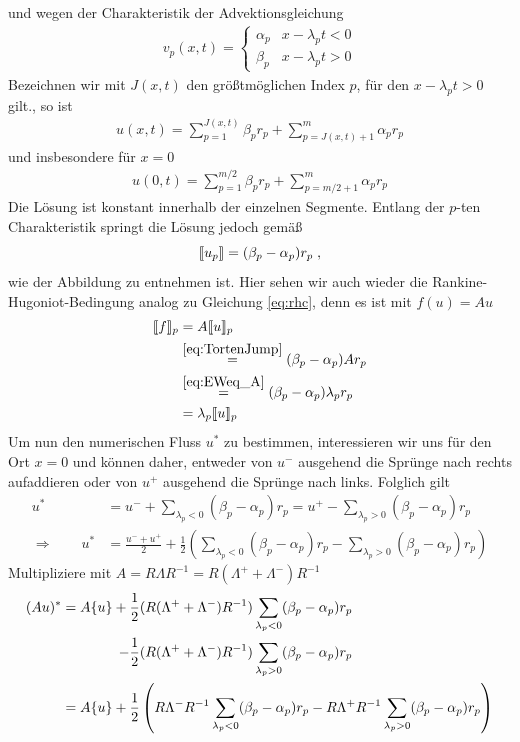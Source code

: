 und wegen der Charakteristik der Advektionsgleichung
\begin{align}
  v_p(x,t) = \begin{cases} \alpha_p & x - \lambda_p t < 0 \\
                           \beta_p & x - \lambda_p t > 0
            \end{cases}
\end{align}
Bezeichnen wir mit $J(x,t)$ den größtmöglichen Index $p$, für den $x-\lambda_p t > 0$ gilt., so ist
\begin{align}
  u(x,t) = \sum_{p=1}^{J(x,t)} \beta_p r_p + \sum_{p={J(x,t)}+1}^m \alpha_p r_p
\end{align}
und insbesondere für $x=0$
\begin{align}
  u(0,t) = \sum_{p=1}^{m/2} \beta_p r_p + \sum_{p=m/2+1}^m \alpha_p r_p
\end{align}
Die Lösung ist konstant innerhalb der einzelnen Segmente. Entlang der $p$-ten Charakteristik springt die Lösung jedoch gemäß
\begin{equation}
  \llbracket u_p \rrbracket = (\beta_p - \alpha_p) r_p \; ,
  \label{eq:TortenJump}
\end{equation}
wie der Abbildung zu entnehmen ist. Hier sehen wir auch wieder die Rankine-Hugoniot-Bedingung analog zu Gleichung \eqref{eq:rhc}, denn es ist mit $f(u) = A u$
\begin{align}
  \llbracket f \rrbracket_p &= A\llbracket u \rrbracket_p\\
  &\stackrel{\eqref{eq:TortenJump}}{=} (\beta_p - \alpha_p) A r_p \\
  &\stackrel{\eqref{eq:EWeq_A}}{=}  (\beta_p - \alpha_p) \lambda_p r_p \\
  &= \lambda_p \llbracket u \rrbracket_p
\end{align}
Um nun den numerischen Fluss $u^*$ zu bestimmen, interessieren wir uns für den Ort $x=0$ und können daher, entweder von $u^-$ ausgehend die Sprünge nach rechts aufaddieren oder von $u^+$ ausgehend die Sprünge nach links. Folglich gilt
\begin{align}
  \label{eq:rhc_1}
  u^* &= u^- + \sum_{\lambda_p < 0} (\beta_p - \alpha_p)r_p = u^+ - \sum_{\lambda_p > 0} (\beta_p - \alpha_p)r_p \\
  \Rightarrow \qquad u^* &= \frac{u^- + u^+}{2} + \frac{1}{2}\left( \sum_{\lambda_p < 0} (\beta_p - \alpha_p)r_p - \sum_{\lambda_p > 0} (\beta_p - \alpha_p)r_p \right)
\end{align}
Multipliziere mit $A=R\Lambda R^{-1} = R(\Lambda^+ + \Lambda^-)R^{-1}$
\begin{align*}
  (Au)^* = A \{ u \} + \frac{1}{2}& (R(\Lambda^+ + \Lambda^-)R^{-1}) \sum_{\lambda_p < 0} (\beta_p - \alpha_p)r_p \\
                     - \frac{1}{2}& (R(\Lambda^+ + \Lambda^-)R^{-1}) \sum_{\lambda_p > 0} (\beta_p - \alpha_p)r_p \\
         = A \{ u \} + \frac{1}{2}&\left( R\Lambda^-R^{-1} \sum_{\lambda_p < 0} (\beta_p - \alpha_p)r_p
                    - R\Lambda^+R^{-1} \sum_{\lambda_p > 0} (\beta_p - \alpha_p)r_p        \right)
\end{align*}
